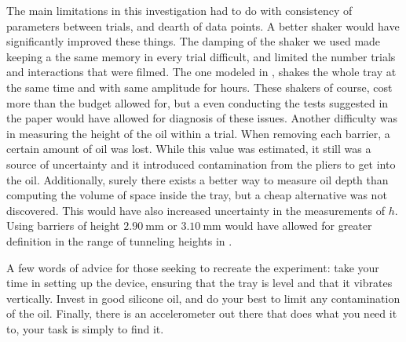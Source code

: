 The main limitations in this investigation had to do with consistency of parameters between trials, and dearth of data points. A better shaker would have significantly improved these things. The damping of the shaker we used made keeping a the same memory in every trial difficult, and limited the number trials and interactions that were filmed. The one modeled in , shakes the whole tray at the same time and with same amplitude for hours. These shakers of course, cost more than the budget allowed for, but a even conducting the tests suggested in the paper would have allowed for diagnosis of these issues. Another difficulty was in measuring the height of the oil within a trial. When removing each barrier, a certain amount of oil was lost. While this value was estimated, it still was a source of uncertainty and it introduced contamination from the pliers to get into the oil. Additionally, surely there exists a better way to measure oil depth than computing the volume of space inside the tray, but a cheap alternative was not discovered. This would have also increased uncertainty in the measurements of $h$. Using barriers of height $2.90~\mathrm{mm}$ or $3.10~\mathrm{mm}$ would have allowed for greater definition in the range of tunneling heights in .


A few words of advice for those seeking to recreate the experiment: take your time in setting up the device, ensuring that the tray is level and that it vibrates vertically. Invest in good silicone oil, and do your best to limit any contamination of the oil. Finally, there is an accelerometer out there that does what you need it to, your task is simply to find it. 